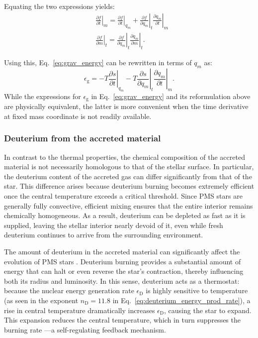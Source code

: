 \documentclass[12pt,a4paper]{article}
\newcommand{\mr}{\mathrm}
\newcommand{\pfird}[2][]{\frac{\partial#1}{\partial#2}}
\begin{document}
Equating the two expressions yields:
\begin{align}
  &\left.\pfird[f]{t}\right|_m = \left.\pfird[f]{t}\right|_{q_m} + \left.\pfird[f]{q_m}\right|_t \left.\pfird[q_m]{t}\right|_m \label{eq:coord_transf1}\\
  &\left.\pfird[f]{m}\right|_t = \left.\pfird[f]{q_m}\right|_t\left.\pfird[q_m]{m}\right|_t. \label{eq:coord_transf2}
\end{align}

Using this, Eq.~\eqref{eq:grav_energy} can be rewritten in terms of $q_m$ as:
\begin{equation}
   \epsilon_\mr{g} = -T \left.\pfird[s]{t}\right|_{q_m} - T \left.\pfird[s]{q_m}\right|_t\left.\pfird[q_m]{t}\right|_m.
\end{equation}
While the expressions for $\epsilon_\mr{g}$ in Eq.~\eqref{eq:grav_energy} and its reformulation above are physically equivalent, the latter is more convenient when the time derivative at fixed mass coordinate is not readily available.

\subsubsection{Deuterium from the accreted material}
\label{sec:deuterium_burning}

In contrast to the thermal properties, the chemical composition of the accreted material is not necessarily homologous to that of the stellar surface. In particular, the deuterium content of the accreted gas can differ significantly from that of the star. This difference arises because deuterium burning becomes extremely efficient once the central temperature exceeds a critical threshold. Since PMS stars are generally fully convective, efficient mixing ensures that the entire interior remains chemically homogeneous. As a result, deuterium can be depleted as fast as it is supplied, leaving the stellar interior nearly devoid of it, even while fresh deuterium continues to arrive from the surrounding environment.

The amount of deuterium in the accreted material can significantly affect the evolution of PMS stars \parencite[e.g.,][]{KunitomoEtAl2017,AmardMatt2023}. Deuterium burning provides a substantial amount of energy that can halt or even reverse the star's contraction, thereby influencing both its radius and luminosity. In this sense, deuterium acts as a thermostat: because the nuclear energy generation rate $\epsilon_\mr{D}$ is highly sensitive to temperature (as seen in the exponent $n_\mr{D} = 11.8$ in Eq.~\eqref{eq:deuterium_energy_prod_rate}), a rise in central temperature dramatically increases $\epsilon_\mr{D}$, causing the star to expand. This expansion reduces the central temperature, which in turn suppresses the burning rate \parencite{StahlerPalla2004}—a self-regulating feedback mechanism.
\end{document}
